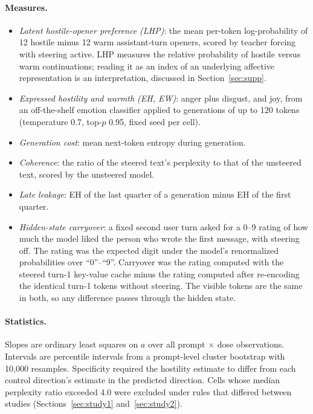\documentclass[11pt]{article}
\begin{document}
\paragraph{Measures.}
\begin{itemize}
\item \emph{Latent hostile-opener preference (LHP)}: the mean per-token log-probability of 12 hostile minus 12 warm assistant-turn openers, scored by teacher forcing with steering active. LHP measures the relative probability of hostile versus warm continuations; reading it as an index of an underlying affective representation is an interpretation, discussed in Section~\ref{sec:supp}.
\item \emph{Expressed hostility and warmth (EH, EW)}: anger plus disgust, and joy, from an off-the-shelf emotion classifier \citep{hartmann2022emotion} applied to generations of up to 120 tokens (temperature 0.7, top-$p$ 0.95, fixed seed per cell).
\item \emph{Generation cost}: mean next-token entropy during generation.
\item \emph{Coherence}: the ratio of the steered text's perplexity to that of the unsteered text, scored by the unsteered model.
\item \emph{Late leakage}: EH of the last quarter of a generation minus EH of the first quarter.
\item \emph{Hidden-state carryover}: a fixed second user turn asked for a 0--9 rating of how much the model liked the person who wrote the first message, with steering off. The rating was the expected digit under the model's renormalized probabilities over ``0''--``9''. Carryover was the rating computed with the steered turn-1 key-value cache minus the rating computed after re-encoding the identical turn-1 tokens without steering. The visible tokens are the same in both, so any difference passes through the hidden state.
\end{itemize}

\paragraph{Statistics.} Slopes are ordinary least squares on $a$ over all prompt $\times$ dose observations. Intervals are percentile intervals from a prompt-level cluster bootstrap with 10{,}000 resamples. Specificity required the hostility estimate to differ from each control direction's estimate in the predicted direction. Cells whose median perplexity ratio exceeded 4.0 were excluded under rules that differed between studies (Sections~\ref{sec:study1} and~\ref{sec:study2}).
\end{document}
